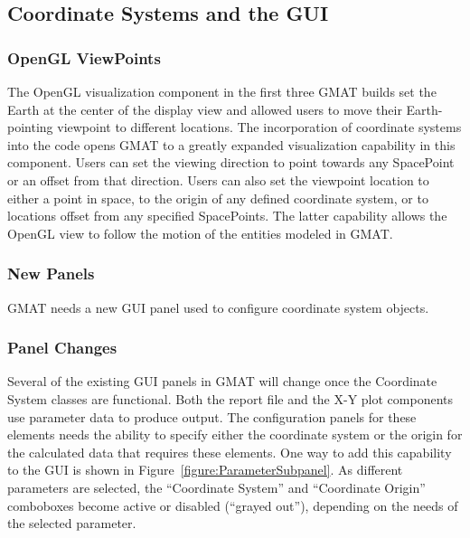 \subsection{Coordinate Systems and the GUI }

\subsubsection{\label{sub:OpenGLViewPoints}OpenGL ViewPoints}

The OpenGL visualization component in the first three GMAT builds set the Earth at the center of the
display view and allowed users to move their Earth-pointing viewpoint to different locations. The
incorporation of coordinate systems into the code opens GMAT to a greatly expanded visualization
capability in this component. Users can set the viewing direction to point towards any SpacePoint or
an offset from that direction. Users can also set the viewpoint location to either a point in space,
to the origin of any defined coordinate system, or to locations offset from any specified
SpacePoints. The latter capability allows the OpenGL view to follow the motion of the entities
modeled in GMAT.

\subsubsection{New Panels}

GMAT needs a new GUI panel used to configure coordinate system objects.

\subsubsection{Panel Changes}

Several of the existing GUI panels in GMAT will change once the Coordinate System classes are
functional. Both the report file and the X-Y plot components use parameter data to produce output.
The configuration panels for these elements needs the ability to specify either the coordinate
system or the origin for the calculated data that requires these elements. One way to add this
capability to the GUI is shown in Figure~\ref{figure:ParameterSubpanel}. As different parameters
are selected, the {}``Coordinate System'' and {}``Coordinate Origin'' comboboxes become active or
disabled ({}``grayed out''), depending on the needs of the selected parameter.

